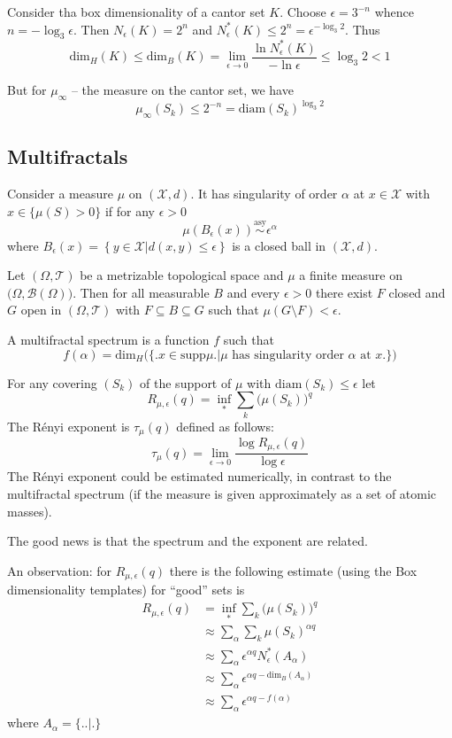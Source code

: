 \documentclass[a4paper]{article}
\newcommand{\obj}[1]{{\left\{ #1 \right \}}}
\newcommand{\induc}[1]{{\left . #1 \right \vert}}
\newcommand{\Xcal}{\mathcal{X}}
\newcommand{\Tcal}{\mathcal{T}}
\newcommand{\borel}{\mathcal{B}}
\begin{document}
Consider tha box dimensionality of a cantor set $K$.
Choose $\epsilon = 3^{-n}$ whence $n=-\log_3 \epsilon$. Then $N_\epsilon(K) = 2^n$ and $N_\epsilon^*(K) \leq 2^n = \epsilon^{-\log_3 2}$. Thus
\[\text{dim}_H(K) \leq \text{dim}_B(K) = \lim_{\epsilon\to 0}\frac{\ln N_\epsilon^*(K)}{-\ln \epsilon}\leq \log_3 2 < 1\]

But for $\mu_\infty$ -- the measure on the cantor set, we have 
\[\mu_\infty(S_k) \leq 2^{-n} = \text{diam}(S_k)^{\log_3 2}\]

\subsection{Multifractals} %
\label{sub:multifractals}

Consider a measure $\mu$ on $(\Xcal, d)$. It has singularity of order $\alpha$ at $x\in \Xcal$ with $x\in \{\mu(S)>0\}$ if for any $\epsilon>0$
\[\mu(B_\epsilon(x)) \overset{\text{asy}}{\sim} \epsilon^\alpha\]
where $B_\epsilon(x) = \obj{\induc{y\in \Xcal}d(x,y)\leq\epsilon}$ is a closed ball in $(\Xcal, d)$.

Let $(\Omega, \Tcal)$ be a metrizable topological space and $\mu$ a finite measure on $\big(\Omega, \borel(\Omega)\big)$. Then for all measurable $B$ and every $\epsilon>0$ there exist $F$ closed and $G$ open in $(\Omega, \Tcal)$ with $F\subseteq B \subseteq G$ such that $\mu(G\setminus F) < \epsilon$.

A multifractal spectrum is a function $f$ such that 
\[f(\alpha) = \text{dim}_H\Big(\big\{\big. x\in \text{supp}\mu\big.\big\rvert \mu \text{ has singularity order } \alpha \text{ at } x \big.\big\}\Big)\]

For any covering $(S_k)$ of the support of $\mu$ with $\text{diam}(S_k)\leq \epsilon$ let
\[R_{\mu,\epsilon}(q) = \inf_* \sum_k \big(\mu(S_k)\big)^q\]
The R\'enyi exponent is $\tau_\mu(q)$ defined as follows:
\[\tau_\mu(q) = \lim_{\epsilon\to 0} \frac{\log R_{\mu,\epsilon}(q) }{\log \epsilon}\]
The R\'enyi exponent could be estimated numerically, in contrast to the multifractal spectrum (if the measure is given approximately as a set of atomic masses).

The good news is that the spectrum and the exponent are related.

An observation: for $R_{\mu,\epsilon}(q)$ there is the following estimate (using the Box dimensionality templates) for ``good'' sets is
\begin{align*}
	R_{\mu,\epsilon}(q)
	&= \inf_* \sum_k \big(\mu(S_k)\big)^q \\
	&\approx \sum_\alpha \sum_k \mu(S_k)^{\alpha q} \\
	&\approx \sum_\alpha \epsilon^{\alpha q} N^*_\epsilon(A_\alpha) \\
	&\approx \sum_\alpha \epsilon^{\alpha q - \text{dim}_B(A_\alpha)}\\
	&\approx \sum_\alpha \epsilon^{\alpha q - f(\alpha)}
\end{align*}
where $A_\alpha = \Big\{\Big. \Big.\Big\rvert \Big.\Big\}$
\end{document}
